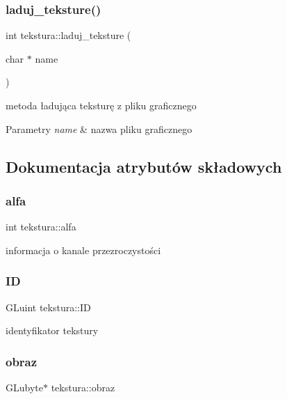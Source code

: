 \subsubsection{\texorpdfstring{laduj\+\_\+teksture()}{laduj\_teksture()}}
{\footnotesize\ttfamily int tekstura\+::laduj\+\_\+teksture (\begin{DoxyParamCaption}\item[{char $\ast$}]{name }\end{DoxyParamCaption})}

metoda ładująca teksturę z pliku graficznego 
\begin{DoxyParams}{Parametry}
{\em name} & nazwa pliku graficznego \\
\hline
\end{DoxyParams}


\subsection{Dokumentacja atrybutów składowych}
\mbox{\label{classtekstura_a4ea10d7111e7689efe1168d4735ee00e}} 
\subsubsection{\texorpdfstring{alfa}{alfa}}
{\footnotesize\ttfamily int tekstura\+::alfa}

informacja o kanale przezroczystości \mbox{\label{classtekstura_a39a96db98ae4b45adbf37589a9f43a82}} 
\subsubsection{\texorpdfstring{ID}{ID}}
{\footnotesize\ttfamily G\+Luint tekstura\+::\+ID}

identyfikator tekstury \mbox{\label{classtekstura_a959484f51bdc568215a4f05dbc3f0210}} 
\subsubsection{\texorpdfstring{obraz}{obraz}}
{\footnotesize\ttfamily G\+Lubyte$\ast$ tekstura\+::obraz}

